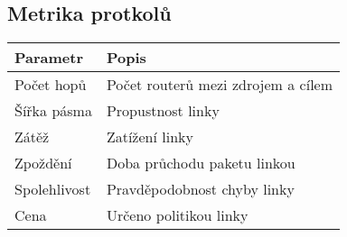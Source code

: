 \subsection{Metrika protkolů}
\begin{tabularx}{\linewidth}{l|l}
  \textbf{Parametr} & \textbf{Popis}                     \\
  \hline
  Počet hopů        & Počet routerů mezi zdrojem a cílem \\
  \hline
  Šířka pásma       & Propustnost linky                  \\
  \hline
  Zátěž             & Zatížení linky                     \\
  \hline
  Zpoždění          & Doba průchodu paketu linkou        \\
  \hline
  Spolehlivost      & Pravděpodobnost chyby linky        \\
  \hline
  Cena              & Určeno politikou linky             \\
\end{tabularx}
